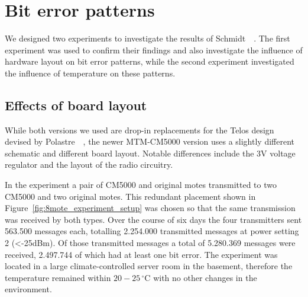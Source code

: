 \section{Bit error patterns}
\label{sec:bit_error_patterns}

We designed two experiments to investigate the results of Schmidt~\etal~\cite{Schmidt2013}.
The first experiment was used to confirm their findings and also investigate the influence of hardware layout on bit error patterns, while the second experiment investigated the influence of temperature on these patterns.

\subsection{Effects of board layout}
\label{subsec:effects_of_board_layout}

While both versions we used are drop-in replacements for the Telos design devised by Polastre~\etal~\cite{Polastre2005}, the newer MTM-CM5000 version uses a slightly different schematic and different board layout.
Notable differences include the 3V voltage regulator and the layout of the radio circuitry.

In the experiment a pair of CM5000 and original motes transmitted to two CM5000 and two original motes.
This redundant placement shown in Figure~\ref{fig:8mote_experiment_setup} was chosen so that the same transmission was received by both types.
Over the course of six days the four transmitters sent 563.500 messages each, totalling 2.254.000 transmitted messages at power setting 2 (<-25dBm). Of those transmitted messages a total of 5.280.369 messages were received, 2.497.744 of which had at least one bit error.
The experiment was located in a large climate-controlled server room in the basement, therefore the temperature remained within $20-25\,^{\circ}\mathrm{C}$ with no other changes in the environment.

